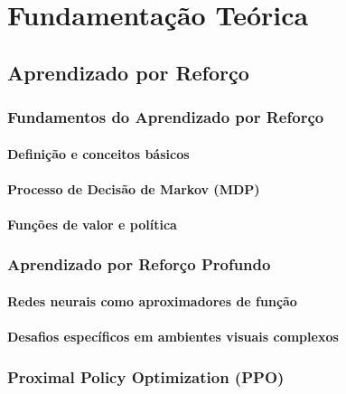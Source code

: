\chapter{Fundamentação Teórica}
\label{cap:fund}

\section{Aprendizado por Reforço}
\label{sec:rl}

\subsection{Fundamentos do Aprendizado por Reforço}
\label{subsec:rl_fund}

\subsubsection{Definição e conceitos básicos}
\label{subsubsec:rl_conceitos}

\subsubsection{Processo de Decisão de Markov (MDP)}
\label{subsubsec:mdp}

\subsubsection{Funções de valor e política}
\label{subsubsec:valor_politica}

\subsection{Aprendizado por Reforço Profundo}
\label{subsec:deep_rl}

\subsubsection{Redes neurais como aproximadores de função}
\label{subsubsec:redes_neurais}

\subsubsection{Desafios específicos em ambientes visuais complexos}
\label{subsubsec:desafios_visuais}

\subsection{Proximal Policy Optimization (PPO)}
\label{subsec:ppo}


